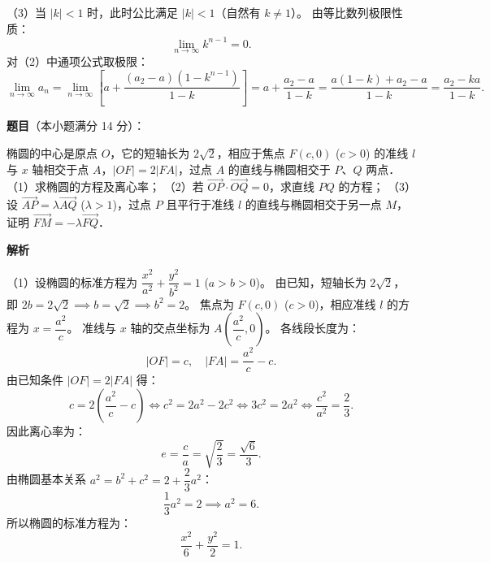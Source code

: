 \begin{answer}
（3）当 $|k| < 1$ 时，此时公比满足 $|k| < 1$（自然有 $k \neq 1$）。
由等比数列极限性质：
\nopagebreak[4]
\[
\lim_{n \to \infty} k^{n-1} = 0.
\]
对（2）中通项公式取极限：
\nopagebreak[4]
\[
\lim_{n \to \infty} a_n = \lim_{n \to \infty} \left[a + \dfrac{(a_2 - a)(1 - k^{n-1})}{1 - k}\right] = a + \dfrac{a_2 - a}{1 - k} = \dfrac{a(1 - k) + a_2 - a}{1 - k} = \dfrac{a_2 - ka}{1 - k}.
\]


\end{answer}
\begin{answer}

\textbf{题目}（本小题满分 14 分）：

椭圆的中心是原点 $O$，它的短轴长为 $2\sqrt{2}$，相应于焦点 $F(c, 0)$ ($c > 0$) 的准线 $l$ 与 $x$ 轴相交于点 $A$，$|OF| = 2|FA|$，过点 $A$ 的直线与椭圆相交于 $P$、$Q$ 两点．
（1）求椭圆的方程及离心率；
（2）若 $\vec{OP} \cdot \vec{OQ} = 0$，求直线 $PQ$ 的方程；
（3）设 $\vec{AP} = \lambda \vec{AQ}$ ($\lambda > 1$)，过点 $P$ 且平行于准线 $l$ 的直线与椭圆相交于另一点 $M$，证明 $\vec{FM} = -\lambda \vec{FQ}$．

\textbf{解析}

（1）设椭圆的标准方程为 $\dfrac{x^2}{a^2} + \dfrac{y^2}{b^2} = 1$ ($a > b > 0$)。
由已知，短轴长为 $2\sqrt{2}$，即 $2b = 2\sqrt{2} \implies b = \sqrt{2} \implies b^2 = 2$。
焦点为 $F(c, 0)$ ($c > 0$)，相应准线 $l$ 的方程为 $x = \dfrac{a^2}{c}$。
准线与 $x$ 轴的交点坐标为 $A\left(\dfrac{a^2}{c}, 0\right)$。
各线段长度为：
\nopagebreak[4]
\[
|OF| = c, \quad |FA| = \dfrac{a^2}{c} - c.
\]
由已知条件 $|OF| = 2|FA|$ 得：
\nopagebreak[4]
\[
c = 2\left(\dfrac{a^2}{c} - c\right) \iff c^2 = 2a^2 - 2c^2 \iff 3c^2 = 2a^2 \iff \dfrac{c^2}{a^2} = \dfrac{2}{3}.
\]
因此离心率为：
\nopagebreak[4]
\[
e = \dfrac{c}{a} = \sqrt{\dfrac{2}{3}} = \dfrac{\sqrt{6}}{3}.
\]
由椭圆基本关系 $a^2 = b^2 + c^2 = 2 + \dfrac{2}{3}a^2$：
\nopagebreak[4]
\[
\dfrac{1}{3}a^2 = 2 \implies a^2 = 6.
\]
所以椭圆的标准方程为：
\nopagebreak[4]
\[
\dfrac{x^2}{6} + \dfrac{y^2}{2} = 1.
\]


\end{answer}
